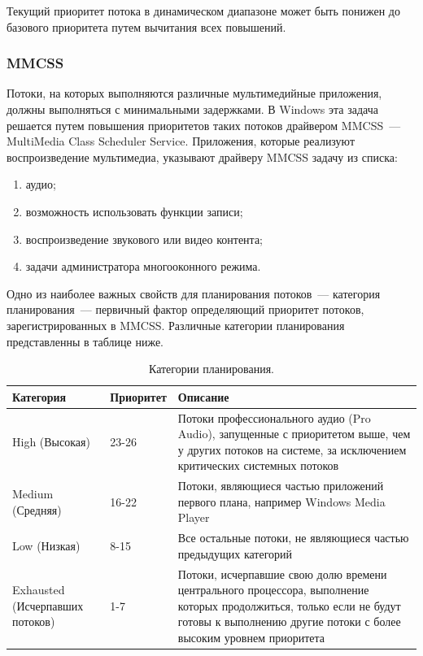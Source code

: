 \documentclass[14pt]{extarticle}
\begin{document}
Текущий приоритет потока в динамическом диапазоне может быть понижен до
базового приоритета путем вычитания всех повышений.

\subsubsection{MMCSS}

Потоки, на которых выполняются различные мультимедийные приложения, должны
выполняться с минимальными задержками. В Windows эта задача решается путем
повышения приоритетов таких потоков драйвером MMCSS~--- MultiMedia Class
Scheduler Service. Приложения, которые реализуют воспроизведение мультимедиа,
указывают драйверу MMCSS задачу из списка:
\begin{enumerate}
    \item аудио;
    \item возможность использовать функции записи;
    \item воспроизведение звукового или видео контента;
    \item задачи администратора многооконного режима.
\end{enumerate}

Одно из наиболее важных свойств для планирования потоков~--- категория
планирования~--- первичный фактор определяющий приоритет потоков,
зарегистрированных в MMCSS. Различные категории планирования представленны в
таблице ниже.

\begin{table}[h!]
    \caption{Категории планирования.}
    \centering
    \begin{tabular}{|p{40mm}|p{30mm}|p{80mm}|}
        \hline
        \textbf{Категория} & \textbf{Приоритет} & \textbf{Описание} \\
        \hline
        High (Высокая) & 23-26 & Потоки профессионального аудио (Pro Audio),
        запущенные с приоритетом выше, чем у других потоков на системе, за
        исключением критических системных потоков \\
        \hline
        Medium (Средняя) & 16-22 & Потоки, являющиеся частью приложений первого
        плана, например Windows Media Player \\
        \hline
        Low (Низкая) & 8-15 & Все остальные потоки, не являющиеся частью
        предыдущих категорий \\
        \hline
        Exhausted (Исчерпавших потоков) & 1-7 & Потоки, исчерпавшие свою долю
        времени центрального процессора, выполнение которых продолжиться,
        только если не будут готовы к выполнению другие потоки с более высоким
        уровнем приоритета \\
        \hline
    \end{tabular}
    \label{tab:plan}
\end{table}
\end{document}
